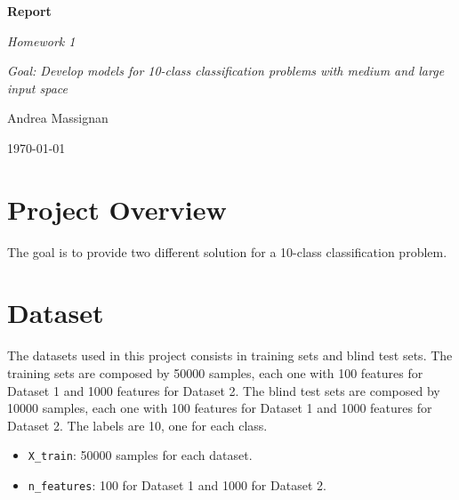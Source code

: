\documentclass{article}
\begin{document}
\begin{titlepage}
    \centering
    \vspace*{2cm}
    {\Huge\bfseries Report\par}
    \vspace{2cm}
    {\Large\itshape Homework 1\par}
    \vspace{0.5cm}
    {\large\itshape Goal: Develop models for 10-class classification problems with medium and large input space\par}
    \vfill
    {\Large Andrea Massignan\par}
    \vfill
    {\large\today\par}
\end{titlepage}

\section*{Project Overview}

The goal is to provide two different solution for a 10-class classification problem. 

\section{Dataset}

The datasets used in this project consists in training sets and blind test sets. 
The training sets are composed by 50000 samples, each one with 100 features for Dataset 1 and 1000 features for Dataset 2. 
The blind test sets are composed by 10000 samples, each one with 100 features for Dataset 1 and 1000 features for Dataset 2. 
The labels are 10, one for each class.

\begin{itemize}
  \item \texttt{X\_train}: 50000 samples for each dataset.
  \item \texttt{n\_features}: 100 for Dataset 1 and 1000 for Dataset 2.

\end{itemize}
\end{document}
